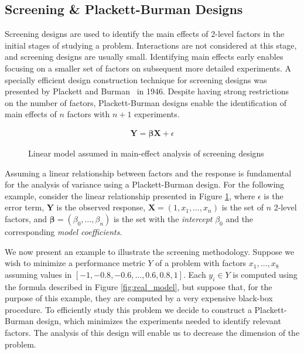 \documentclass[conference]{IEEEtran}
\begin{document}
\subsection{Screening \& Plackett-Burman Designs}
\label{sec:orgf9fbd21}
Screening designs are used to identify the main effects of 2-level factors in
the initial stages of studying a problem. Interactions are not considered at
this stage, and screening designs are usually small. Identifying main effects
early enables focusing on a smaller set of factors on subsequent more detailed
experiments. A specially efficient design construction technique for screening
designs was presented by Plackett and Burman~\cite{plackett1946design}
in 1946. Despite having strong restrictions on the number of factors,
Plackett-Burman designs enable the identification of main effects of \(n\) factors
with \(n + 1\) experiments.

\begin{figure}[htpb]
{\normalsize
\begin{align*}
\mathbf{Y} = \bm{\beta}\mathbf{X} + \epsilon
\end{align*}
}
\caption{Linear model assumed in main-effect analysis of screening designs}
\label{fig:linear_assumption}
\end{figure}

Assuming a linear relationship between factors and the response is fundamental
for the analysis of variance using a Plackett-Burman design. For the following
example, consider the linear relationship presented in Figure
\ref{fig:linear_assumption}, where \(\epsilon\) is the error term, \(\mathbf{Y}\) is
the observed response, \(\mathbf{X} = \left(1, x_1,\dots,x_n\right)\) is the set
of \(n\) 2-level factors, and \(\bm{\beta} = \left(\beta_0,\dots,\beta_n\right)\) is
the set with the \emph{intercept} \(\beta_0\) and the corresponding \emph{model
coefficients}.

We now present an example to illustrate the screening methodology. Suppose we
wish to minimize a performance metric \(Y\) of a problem with factors
\(x_1,\dots,x_8\) assuming values in \([-1, -0.8, -0.6, \dots, 0.6, 0.8, 1]\). Each
\(y_i \in Y\) is computed using the formula described in Figure
\ref{fig:real_model}, but suppose that, for the purpose of this example, they
are computed by a very expensive black-box procedure. To efficiently study this
problem we decide to construct a Plackett-Burman design, which minimizes the
experiments needed to identify relevant factors. The analysis of this design
will enable us to decrease the dimension of the problem.
\end{document}
